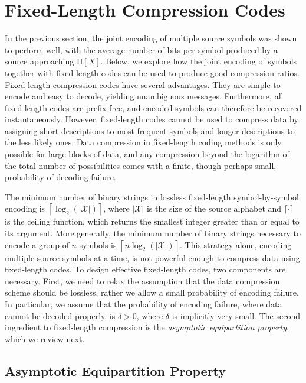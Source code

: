 \section{Fixed-Length Compression Codes}

In the previous section, the joint encoding of multiple source symbols was shown to perform well, with the average number of bits per symbol produced by a source approaching $\mathrm{H}[X]$.
Below, we explore how the joint encoding of symbols together with fixed-length codes can be used to produce good compression ratios.
Fixed-length compression codes have several advantages.
They are simple to encode and easy to decode, yielding unambiguous messages.
Furthermore, all fixed-length codes are prefix-free, and encoded symbols can therefore be recovered instantaneously.
However, fixed-length codes cannot be used to compress data by assigning short descriptions to most frequent symbols and longer descriptions to the less likely ones.
Data compression in fixed-length coding methods is only possible for large blocks of data, and any compression beyond the logarithm of the total number of possibilities comes with a finite, though perhaps small, probability of decoding failure.

The minimum number of binary strings in lossless fixed-length symbol-by-symbol encoding is $\left\lceil \log_2 ( | \mathcal{X} | ) \right\rceil$, where $| \mathcal{X} |$ is the size of the source alphabet and $\lceil \cdot \rceil$ is the ceiling function, which returns the smallest integer greater than or equal to its argument.
More generally, the minimum number of binary strings necessary to encode a group of $n$ symbols is $\left\lceil n \log_2 ( | \mathcal{X} | ) \right\rceil$.
This strategy alone, encoding multiple source symbols at a time, is not powerful enough to compress data using fixed-length codes.
To design effective fixed-length codes, two components are necessary.
First, we need to relax the assumption that the data compression scheme should be lossless, rather we allow a small probability of encoding failure.
In particular, we assume that the probability of encoding failure, where data cannot be decoded properly, is $\delta > 0$, where $\delta$ is implicitly very small.
The second ingredient to fixed-length compression is the \emph{asymptotic equipartition property}, which we review next.


\subsection{Asymptotic Equipartition Property}

